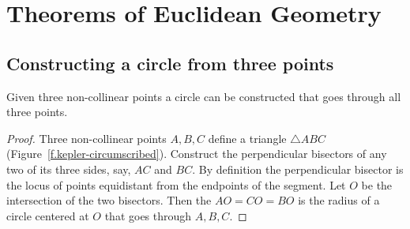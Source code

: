 
\chapter{Theorems of Euclidean Geometry}\label{s.elementary}

\section{Constructing a circle from three points}

\begin{theorem}\label{thm.three-points}
Given three non-collinear points a circle can be constructed that goes through all three points.
\end{theorem}

\begin{proof}
Three non-collinear points $A,B,C$ define a triangle $\triangle ABC$ (Figure~\ref{f.kepler-circumscribed}). Construct the perpendicular bisectors of any two of its three sides, say, $AC$ and $BC$. By definition the perpendicular bisector is the locus of points equidistant from the endpoints of the segment. Let $O$ be the intersection of the two bisectors. Then the $AO=CO=BO$ is the radius of a circle centered at $O$ that goes through $A,B,C$.\hqed
\end{proof}

